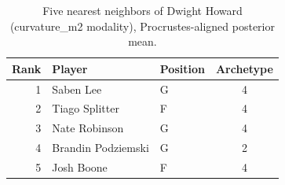 \begin{table}[htbp]
  \centering\small
  \begin{tabular}{rllc}
    \toprule
    Rank & Player & Position & Archetype \\
    \midrule
    1 & Saben Lee & G & 4 \\
    2 & Tiago Splitter & F & 4 \\
    3 & Nate Robinson & G & 4 \\
    4 & Brandin Podziemski & G & 2 \\
    5 & Josh Boone & F & 4 \\
    \bottomrule
  \end{tabular}
  \caption{Five nearest neighbors of Dwight Howard (curvature_m2 modality), Procrustes-aligned posterior mean.}
  \label{tab:Dwight_Howard_neighbors_curvature_m2}
\end{table}

